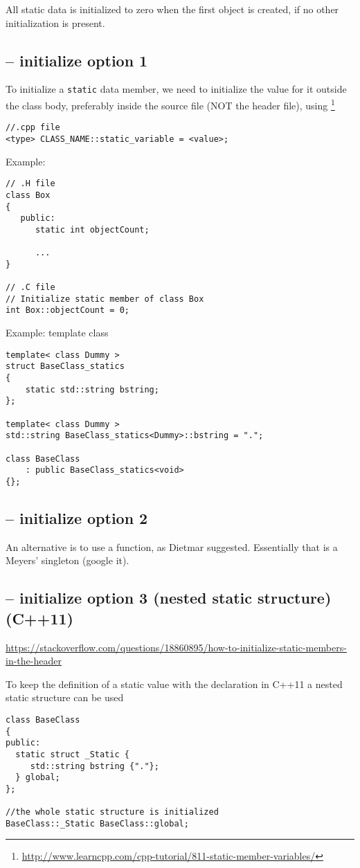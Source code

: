 All static data is initialized to zero when the first object is created, if no
other initialization is present.

\subsection{-- initialize option 1}

To initialize a \verb!static! data member, we need to initialize the
value for it outside the class body, preferably inside the source file
(NOT the header file), using
\footnote{\url{http://www.learncpp.com/cpp-tutorial/811-static-member-variables/}}
\begin{verbatim}
//.cpp file
<type> CLASS_NAME::static_variable = <value>;
\end{verbatim}

Example:
\begin{lstlisting}
// .H file
class Box
{
   public:
      static int objectCount;

      ...
}

// .C file
// Initialize static member of class Box
int Box::objectCount = 0;
\end{lstlisting}

Example: template class
\begin{lstlisting}
template< class Dummy >
struct BaseClass_statics
{
    static std::string bstring;
};

template< class Dummy >
std::string BaseClass_statics<Dummy>::bstring = ".";

class BaseClass
    : public BaseClass_statics<void>
{};
\end{lstlisting}

\subsection{-- initialize option 2}

An alternative is to use a function, as Dietmar suggested. Essentially that is a Meyers' singleton (google it).

\subsection{-- initialize option 3 (nested static structure) (C++11)}

\url{https://stackoverflow.com/questions/18860895/how-to-initialize-static-members-in-the-header}

To keep the definition of a static value with the declaration in C++11 a nested static structure can be used
\begin{lstlisting}
class BaseClass
{
public:
  static struct _Static {
     std::string bstring {"."};
  } global;
};

//the whole static structure is initialized
BaseClass::_Static BaseClass::global;

\end{lstlisting}

